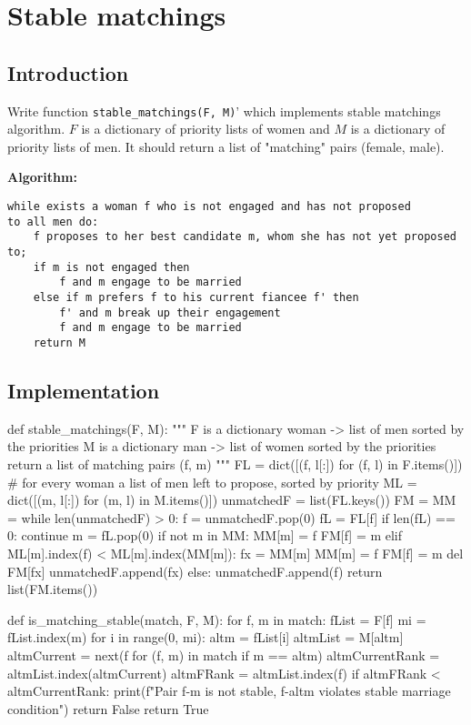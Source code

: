 \chapter{Stable matchings}

\section{Introduction}

Write function \verb`stable_matchings(F, M)`' which implements stable matchings algorithm. $F$ is a dictionary of priority lists of women and $M$ is a dictionary of priority lists of men. It should return a list of "matching" pairs (female, male).

\medskip
\noindent \textbf{Algorithm:}
\begin{verbatim}
while exists a woman f who is not engaged and has not proposed
to all men do:
    f proposes to her best candidate m, whom she has not yet proposed to;
    if m is not engaged then
        f and m engage to be married
    else if m prefers f to his current fiancee f' then
        f' and m break up their engagement
        f and m engage to be married
    return M
\end{verbatim}

\section{Implementation}

\begin{sageCell}
def stable_matchings(F, M):
    """
    F is a dictionary woman -> list of men sorted by the priorities
    M is a dictionary man -> list of women sorted by the priorities
    return a list of matching pairs (f, m)
    """
    FL = dict([(f, l[:]) for (f, l) in F.items()]) # for every woman a list of men left to propose, sorted by priority
    ML = dict([(m, l[:]) for (m, l) in M.items()])
    unmatchedF = list(FL.keys())
    FM = {}
    MM = {}
    while len(unmatchedF) > 0:
        f = unmatchedF.pop(0)
        fL = FL[f]
        if len(fL) == 0:
            continue
        m = fL.pop(0)
        if not m in MM:
            MM[m] = f
            FM[f] = m
        elif ML[m].index(f) < ML[m].index(MM[m]):
            fx = MM[m]
            MM[m] = f
            FM[f] = m
            del FM[fx]
            unmatchedF.append(fx)
        else:
            unmatchedF.append(f)
    return list(FM.items())
\end{sageCell}

\begin{sageCell}
def is_matching_stable(match, F, M):
    for f, m in match:
        fList = F[f]
        mi = fList.index(m)
        for i in range(0, mi):
            altm = fList[i]
            altmList = M[altm]
            altmCurrent = next(f for (f, m) in match if m == altm)
            altmCurrentRank = altmList.index(altmCurrent)
            altmFRank = altmList.index(f)
            if altmFRank < altmCurrentRank:
                print(f"Pair {f}-{m} is not stable, {f}-{altm} violates stable marriage condition")
                return False
    return True
\end{sageCell}

